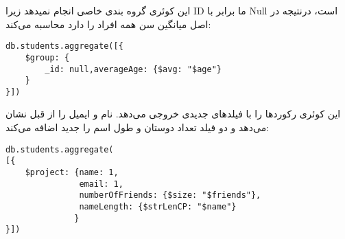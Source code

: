 این کوئری گروه بندی خاصی انجام نمیدهد زیرا ID ما برابر با Null است، درنتیجه در اصل میانگین سن همه افراد را دارد محاسبه می‌کند:
\setLTR
\begin{lstlisting}
db.students.aggregate([{
	$group: {
		_id: null,averageAge: {$avg: "$age"}
	}
}])
\end{lstlisting}
\setRTL

این کوئری رکوردها را با فیلدهای جدیدی خروجی می‌دهد. نام و ایمیل را از قبل نشان می‌دهد و دو فیلد تعداد دوستان و طول اسم را جدید اضافه می‌کند:
\setLTR
\begin{lstlisting}
db.students.aggregate(
[{
	$project: {name: 1,
			   email: 1,
			   numberOfFriends: {$size: "$friends"},
			   nameLength: {$strLenCP: "$name"}
			  }
}])
\end{lstlisting}
\setRTL
